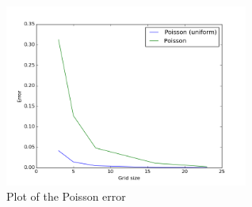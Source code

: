 \documentclass{article}
\begin{document}
\begin{figure}[!h]
\caption{Plot of the Poisson error}
\includegraphics[width=8cm]{poisson}
\centering
\end{figure}
\end{document}
